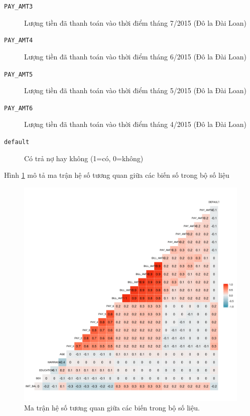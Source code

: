\documentclass[a4paper]{report}\usepackage[]{graphicx}\usepackage[]{color}
\makeatletter
\def\maxwidth{ %
  \ifdim\Gin@nat@width>\linewidth
    \linewidth
  \else
    \Gin@nat@width
  \fi
}
\newenvironment{knitrout}{}{} %
\makeatother
\begin{document}
\begin{description}
  \item [\texttt{PAY\_AMT3}] Lượng tiền đã thanh toán vào thời điểm tháng 7/2015 (Đô la Đài Loan)
  \item [\texttt{PAY\_AMT4}] Lượng tiền đã thanh toán vào thời điểm tháng 6/2015 (Đô la Đài Loan)
  \item [\texttt{PAY\_AMT5}] Lượng tiền đã thanh toán vào thời điểm tháng 5/2015 (Đô la Đài Loan)
  \item [\texttt{PAY\_AMT6}] Lượng tiền đã thanh toán vào thời điểm tháng 4/2015 (Đô la Đài Loan)
  \item [\texttt{default}] Có trả nợ hay không (1=có, 0=không)
\end{description}
Hình \ref{fig:data_corr_mat} mô tả ma trận hệ số tương quan giữa các biến số trong bộ số liệu

\begin{figure}
\begin{center}
\begin{knitrout}
\color{fgcolor}
\includegraphics[width=\maxwidth]{figure/corr_mat-1} 

\end{knitrout}
\caption{Ma trận hệ số tương quan giữa các biến trong bộ số liệu.}
\label{fig:data_corr_mat}
\end{center}
\end{figure}
\end{document}
